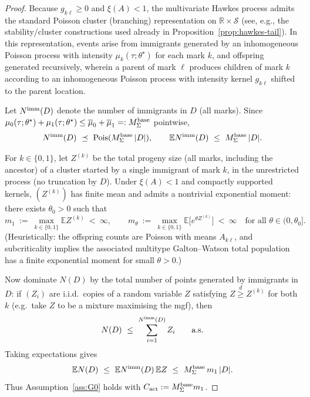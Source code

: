 \documentclass{statsoc}
\newcommand{\bbE}{\mathbb{E}}
\newcommand{\bbR}{\mathbb{R}}
\newcommand{\1}{\mathbbm{1}}
\begin{document}
\begin{proof}
Because $g_{k\ell}\ge 0$ and $\xi(A)<1$, the multivariate Hawkes process admits the standard Poisson cluster (branching) representation on $\bbR\times\mathcal S$ (see, e.g., the stability/cluster constructions used already in Proposition~\ref{prop:hawkes-tail}). In this representation, events arise from immigrants generated by an inhomogeneous Poisson process with intensity $\mu_k(\tau;\theta^\star)$ for each mark $k$, and offspring generated recursively, wherein a parent of mark $\ell$ produces children of mark $k$ according to an inhomogeneous Poisson process with intensity kernel $g_{k\ell}$ shifted to the parent location.


Let $N^{\rm imm}(D)$ denote the number of immigrants in $D$ (all marks). Since
$\mu_0(\tau;\theta^\star)+\mu_1(\tau;\theta^\star)\le \overline\mu_0+\overline\mu_1=:M_\Sigma^{\rm base}$ pointwise,
\[
N^{\rm imm}(D)\ \preceq\ \mathrm{Pois}(M_\Sigma^{\rm base}\,|D|),
\qquad
\bbE N^{\rm imm}(D)\ \le\ M_\Sigma^{\rm base}\,|D|.
\]

For $k\in\{0,1\}$, let $Z^{(k)}$ be the total progeny size (all marks, including the ancestor) of a
cluster started by a single immigrant of mark $k$, in the unrestricted process (no truncation by $D$).
Under $\xi(A)<1$ and compactly supported kernels, $(Z^{(k)})$ has finite mean and admits a nontrivial
exponential moment: there exists $\theta_0>0$ such that
\[
m_1\ :=\ \max_{k\in\{0,1\}}\bbE Z^{(k)}\ <\ \infty,
\qquad
m_\theta\ :=\ \max_{k\in\{0,1\}}\bbE\big[e^{\theta Z^{(k)}}\big]\ <\ \infty
\quad\text{for all }\theta\in(0,\theta_0].
\]
(Heuristically: the offspring counts are Poisson with means $A_{k\ell}$, and subcriticality implies the
associated multitype Galton--Watson total population has a finite exponential moment for small $\theta>0$.)

Now dominate $N(D)$ by the total number of points generated by immigrants in $D$:
if $(Z_i)$ are i.i.d.\ copies of a random variable $Z$ satisfying $Z\overset{d}{\ge} Z^{(k)}$ for both $k$
(e.g.\ take $Z$ to be a mixture maximising the mgf), then
\[
N(D)\ \le\ \sum_{i=1}^{N^{\rm imm}(D)} Z_i
\qquad\text{a.s.}
\]
Taking expectations gives
\[
\bbE N(D)\ \le\ \bbE N^{\rm imm}(D)\,\bbE Z\ \le\ M_\Sigma^{\rm base}\,m_1\,|D|.
\]
Thus Assumption~\ref{ass:G0} holds with $C_{\rm act}:=M_\Sigma^{\rm base}m_1$.


\end{proof}
\end{document}
